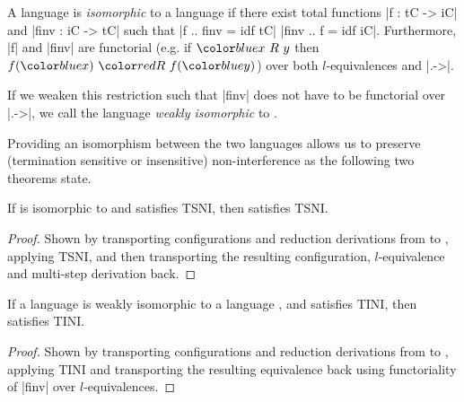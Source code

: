 \begin{definition}
  A language  is \textit{isomorphic} to a
  language  if there exist total functions |f
  : tC -> iC| and |finv : iC -> tC| such that |f .. finv = idf tC| |finv
  .. f = idf iC|.  Furthermore, |f| and |finv| are functorial (e.g. if
  $\abs{x\ R\ y}$ then $f(\abs{x})\ \con{R}\ f(\abs{y})$) over both
  $l$-equivalences and |.->|.
  
  If we weaken this restriction such that |finv| does
  not have to be functorial over |.->|, we call the
  language  \textit{weakly isomorphic} to
  .
\end{definition}

Providing an isomorphism between the two languages allows us to
preserve (termination sensitive or insensitive) non-interference
as the following two theorems state.

\begin{theorem}
  \label{thm:iso-tsni}
  If  is isomorphic to  and  satisfies TSNI, then
   satisfies TSNI.
\end{theorem}

\begin{proof}
  Shown by transporting configurations and reduction derivations from
   to , applying TSNI, and then transporting the
  resulting configuration, $l$-equivalence and multi-step derivation back.
\end{proof}

\begin{theorem}
  \label{thm:iso-tini}
  If a language  is weakly isomorphic to a language , and 
  satisfies TINI, then  satisfies TINI.
\end{theorem}

\begin{proof}
  Shown by transporting configurations and reduction derivations
  from  to , applying TINI and transporting the resulting
  equivalence back using functoriality of |finv| over $l$-equivalences.
\end{proof}

